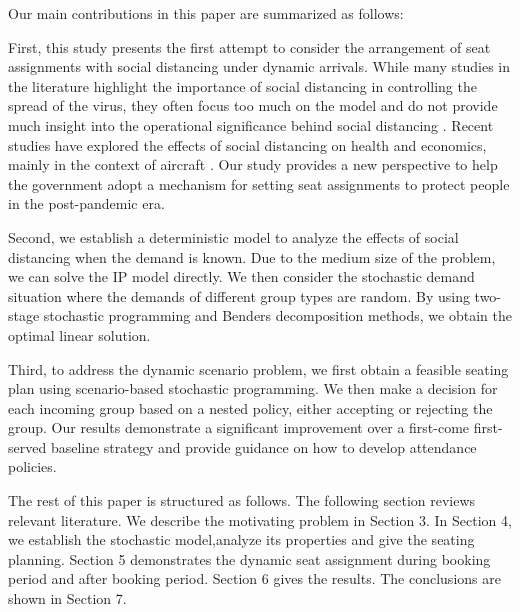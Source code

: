 Our main contributions in this paper are summarized as follows:

First, this study presents the first attempt to consider the arrangement of seat assignments with social distancing under dynamic arrivals. While many studies in the literature highlight the importance of social distancing in controlling the spread of the virus, they often focus too much on the model and do not provide much insight into the operational significance behind social distancing \cite{barry2021optimal, fischetti2021safe}. Recent studies have explored the effects of social distancing on health and economics, mainly in the context of aircraft \cite{salari2020social, ghorbani2020model, salari2022social}. Our study provides a new perspective to help the government adopt a mechanism for setting seat assignments to protect people in the post-pandemic era.

Second, we establish a deterministic model to analyze the effects of social distancing when the demand is known. Due to the medium size of the problem, we can solve the IP model directly. We then consider the stochastic demand situation where the demands of different group types are random. By using two-stage stochastic programming and Benders decomposition methods, we obtain the optimal linear solution.

Third, to address the dynamic scenario problem, we first obtain a feasible seating plan using scenario-based stochastic programming. We then make a decision for each incoming group based on a nested policy, either accepting or rejecting the group. Our results demonstrate a significant improvement over a first-come first-served baseline strategy and provide guidance on how to develop attendance policies.






The rest of this paper is structured as follows. The following section reviews relevant literature. We describe the motivating problem in Section 3. In Section 4, we establish the stochastic model,analyze its properties and give the seating planning. Section 5 demonstrates the dynamic seat assignment during booking period and after booking period. Section 6 gives the results. The conclusions are shown in Section 7.

\newpage
